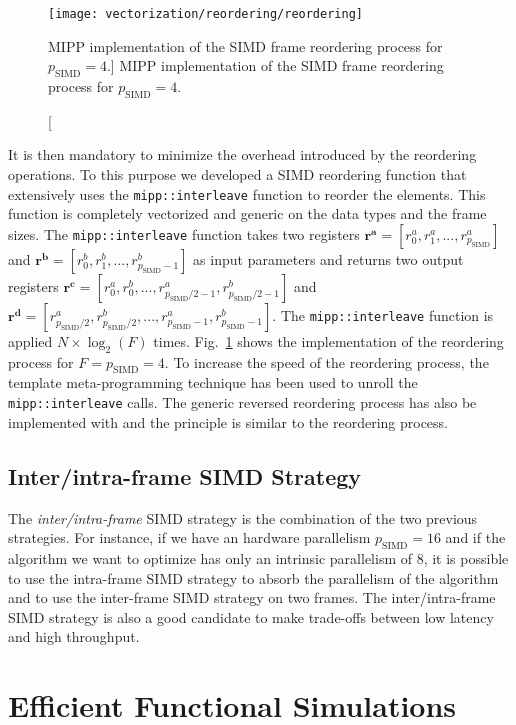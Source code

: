 \begin{figure}[htp]
  \centering
  \texttt{[image: vectorization/reordering/reordering]}
  \caption
    [MIPP implementation of the SIMD frame reordering process for
     $p_\text{SIMD} = 4$.]
    {MIPP implementation of the SIMD frame reordering process for
     $p_\text{SIMD} = 4$.}
  \label{fig:vec_reordering_process_inter_simd_mipp}
\end{figure}

It is then mandatory to minimize the overhead introduced by the reordering
operations. To this purpose we developed a SIMD reordering function that
extensively uses the \verb|mipp::interleave| function to reorder the elements.
This function is completely vectorized and generic on the data types and the
frame sizes. The \verb|mipp::interleave| function takes two registers $\bm{r^a}
= [r^a_0, r^a_1, ..., r^a_{p_\text{SIMD}}]$ and $\bm{r^b} = [r^b_0, r^b_1,
..., r^b_{p_\text{SIMD}-1}]$ as input parameters and returns two output
registers $\bm{r^c} = [r^a_0, r^b_0, ..., r^a_{p_\text{SIMD}/2-1},
r^b_{p_\text{SIMD}/2-1}]$ and $\bm{r^d} = [r^a_{p_\text{SIMD}/2},
r^b_{p_\text{SIMD}/2}, ..., r^a_{p_\text{SIMD}-1}, r^b_{p_\text{SIMD}-1}]$.
The \verb|mipp::interleave| function is applied $N \times \log_2(F)$ times.
Fig.~\ref{fig:vec_reordering_process_inter_simd_mipp} shows the \MIPP
implementation of the reordering process for $F = p_\text{SIMD} = 4$. To
increase the speed of the reordering process, the template meta-programming
technique has been used to unroll the \verb|mipp::interleave| calls. The generic
reversed reordering process has also be implemented with \MIPP and the principle
is similar to the reordering process.

\subsection{Inter/intra-frame SIMD Strategy}

The \emph{inter/intra-frame} SIMD strategy is the combination of the two
previous strategies. For instance, if we have an hardware parallelism
$p_\text{SIMD} = 16$ and if the algorithm we want to optimize has only an
intrinsic parallelism of 8, it is possible to use the intra-frame SIMD strategy
to absorb the parallelism of the algorithm and to use the inter-frame SIMD
strategy on two frames. The inter/intra-frame SIMD strategy is also a good
candidate to make trade-offs between low latency and high throughput.

\section{Efficient Functional Simulations}

